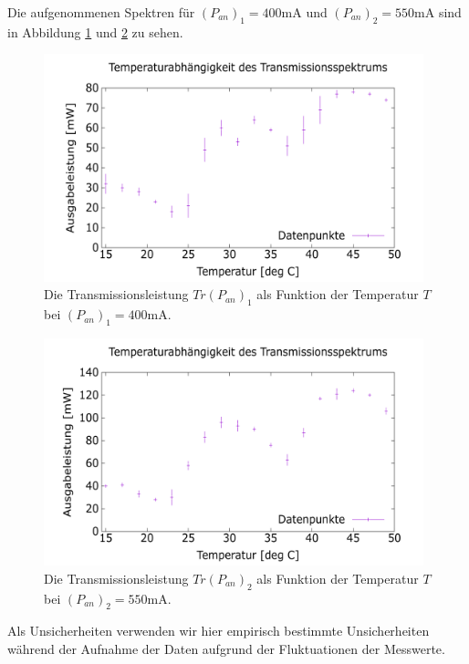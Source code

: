\documentclass[../../main.tex]{subfiles}
\begin{document}
    Die aufgenommenen Spektren für $(P_{\textit{an}})_1 = 400\si{\mA}$ und $(P_{\textit{an}})_2 = 550\si{\mA}$ sind in Abbildung \ref{fig:TransmissionOverTemperature400mA} und \ref{fig:TransmissionOverTemperature550mA} zu sehen.

    \begin{figure}[H]
        \centering
        \includegraphics[width=11cm]{../../Bilddateien/1-1/TransmissionOverTemperature400mA.png}
        \caption{Die Transmissionsleistung $\textit{Tr}(P_{\textit{an}})_1$ als Funktion der Temperatur $T$ bei $(P_{\textit{an}})_1 = 400\si{\mA}$.}
        \label{fig:TransmissionOverTemperature400mA}
    \end{figure}

    \begin{figure}[H]
        \centering
        \includegraphics[width=11cm]{../../Bilddateien/1-1/TransmissionOverTemperature550mA.png}
        \caption{Die Transmissionsleistung $\textit{Tr}(P_{\textit{an}})_2$ als Funktion der Temperatur $T$ bei $(P_{\textit{an}})_2 = 550\si{\mA}$.}
        \label{fig:TransmissionOverTemperature550mA}
    \end{figure}
    Als Unsicherheiten verwenden wir hier empirisch bestimmte Unsicherheiten während der Aufnahme der Daten aufgrund der Fluktuationen der Messwerte.
\end{document}
